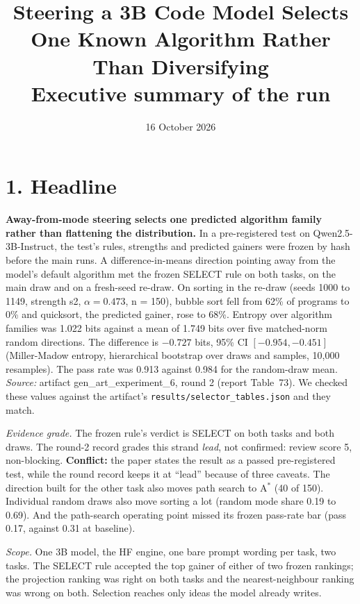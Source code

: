 \documentclass[10pt,letterpaper]{article}
\title{Steering a 3B Code Model Selects One Known Algorithm Rather Than Diversifying\\[3pt]\large Executive summary of the run}
\date{16 October 2026}
\author{}
\begin{document}
\maketitle
\vspace{-2.5em}

\section*{1. Headline}

\textbf{Away-from-mode steering selects one predicted algorithm family rather than flattening the distribution.} In a pre-registered test on Qwen2.5-3B-Instruct, the test's rules, strengths and predicted gainers were frozen by hash before the main runs. A difference-in-means direction pointing away from the model's default algorithm met the frozen SELECT rule on both tasks, on the main draw and on a fresh-seed re-draw. On sorting in the re-draw (seeds 1000 to 1149, strength s2, $\alpha = 0.473$, n = 150), bubble sort fell from 62\% of programs to 0\% and quicksort, the predicted gainer, rose to 68\%. Entropy over algorithm families was 1.022 bits against a mean of 1.749 bits over five matched-norm random directions. The difference is $-0.727$ bits, 95\% CI $[-0.954, -0.451]$ (Miller-Madow entropy, hierarchical bootstrap over draws and samples, 10,000 resamples). The pass rate was 0.913 against 0.984 for the random-draw mean. \emph{Source:} artifact gen\_art\_experiment\_6, round 2 (report Table~73). We checked these values against the artifact's \texttt{results/selector\_tables.json} and they match.

\emph{Evidence grade.} The frozen rule's verdict is SELECT on both tasks and both draws. The round-2 record grades this strand \emph{lead}, not confirmed: review score 5, non-blocking. \textbf{Conflict:} the paper states the result as a passed pre-registered test, while the round record keeps it at ``lead'' because of three caveats. The direction built for the other task also moves path search to A$^*$ (40 of 150). Individual random draws also move sorting a lot (random mode share 0.19 to 0.69). And the path-search operating point missed its frozen pass-rate bar (pass 0.17, against 0.31 at baseline).

\emph{Scope.} One 3B model, the HF engine, one bare prompt wording per task, two tasks. The SELECT rule accepted the top gainer of either of two frozen rankings; the projection ranking was right on both tasks and the nearest-neighbour ranking was wrong on both. Selection reaches only ideas the model already writes.
\end{document}
